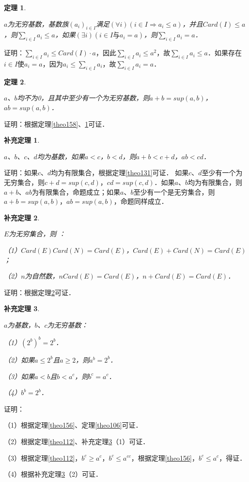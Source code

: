 \documentclass[12pt, a4paper, oneside]{book}
\newtheorem{theo}{定理}
\newtheorem{cor}{补充定理}
\begin{document}
			\begin{theo}\label{theo159}
				\hfill\par
				$a$为无穷基数，基数族$(a_i)_{i\in I}$满足$(\forall i)(i\in I\Rightarrow a_i\leq a)$，并且$Card(I)\leq a$，则$\sum\limits_{i\in I}a_i\leq a$，如果$(\exists i)(i\in I\text{与}a_i=a)$，则$\sum\limits_{i\in I}a_i=a$．
			\end{theo}
			证明：$\sum\limits_{i\in I}a_i\leq Card(I)\cdot a$，因此$\sum\limits_{i\in I}a_i\leq a^2$，故$\sum\limits_{i\in I}a_i\leq a$．如果存在$i\in I$使$a_i=a$，因为$a_i\leq \sum\limits_{i\in I}a_i$，故$\sum\limits_{i\in I}a_i=a$．
			
			\begin{theo}\label{theo160}
				\hfill\par
				$a$、$b$均不为0，且其中至少有一个为无穷基数，则$a+b=sup(a, b)$，$ab=sup(a, b)$．
			\end{theo}
			证明：根据定理\ref{theo158}、\ref{theo159}可证．
						
			\begin{cor}\label{cor334}
				\hfill\par
				$a$、$b$、$c$、$d$均为基数，如果$a<c$，$b<d$，则$a+b<c+d$，$ab<cd$．
			\end{cor}
			证明：如果$c$、$d$均为有限集合，根据定理\ref{theo131}可证．
			如果$c$、$d$至少有一个为无穷集合，则$c+d=sup(c, d)$，$cd=sup(c, d)$．如果$a$、$b$均为有限集合，则$a+b$、$ab$为有限集合，命题成立；如果$a$、$b$至少有一个是无穷集合，则$a+b=sup(a, b)$，$ab=sup(a, b)$，命题同样成立．
			
			\begin{cor}\label{cor335}
				\hfill\par
				$E$为无穷集合，则 ：
				\par
				（1）$Card(E)Card(N)=Card(E)$，$Card(E)+Card(N)=Card(E)$；
				\par
				（2）$n$为自然数，$nCard(E)=Card(E)$，$n+Card(E)=Card(E)$．
			\end{cor}
			证明：根据定理\ref{theo160}可证．
			
			\begin{cor}\label{cor336}
				\hfill\par
				$a$为基数，$b$、$c$为无穷基数：
				\par
				（1）$(2^b)^b=2^b$．
				\par
				（2）如果$a\leq 2^b$且$a\geq 2$，则$a^b=2^b$．
				\par
				（3）如果$a<b$且$b<a^c$，则$b^c=a^c$．
				\par
				（4）$b^b=2^b$．
			\end{cor}
			证明：
			\par
			（1）根据定理\ref{theo156}、定理\ref{theo106}可证．
			\par
			（2）根据定理\ref{theo112}、补充定理\ref{cor336}（1）可证．
			\par
			（3）根据定理\ref{theo112}，$b^c\geq a^c$，$b^c\leq a^{cc}$，根据定理\ref{theo156}，$b^c\leq a^c$，得证．
			\par
			（4）根据补充定理\ref{cor336}（2）可证．
			
\end{document}
